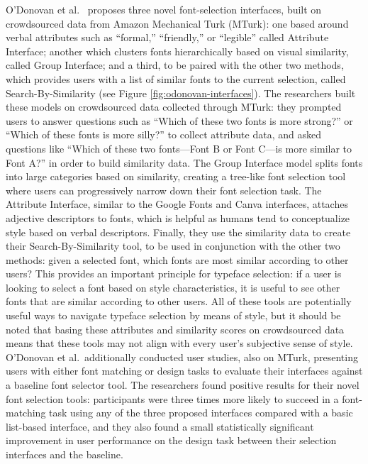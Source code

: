O'Donovan et al.\ \cite{odonovan2014} proposes three novel font-selection interfaces, built on crowdsourced data from Amazon Mechanical Turk (MTurk): one based around verbal attributes such as ``formal,'' ``friendly,'' or ``legible'' called Attribute Interface; another which clusters fonts hierarchically based on visual similarity, called Group Interface; and a third, to be paired with the other two methods, which provides users with a list of similar fonts to the current selection, called Search-By-Similarity (see Figure \ref{fig:odonovan-interfaces}). The researchers built these models on crowdsourced data collected through MTurk: they prompted users to answer questions such as ``Which of these two fonts is more strong?'' or ``Which of these fonts is more silly?'' to collect attribute data, and asked questions like ``Which of these two fonts—Font B or Font C—is more similar to Font A?'' in order to build similarity data. The Group Interface model splits fonts into large categories based on similarity, creating a tree-like font selection tool where users can progressively narrow down their font selection task. The Attribute Interface, similar to the Google Fonts and Canva interfaces, attaches adjective descriptors to fonts, which is helpful as humans tend to conceptualize style based on verbal descriptors. Finally, they use the similarity data to create their Search-By-Similarity tool, to be used in conjunction with the other two methods: given a selected font, which fonts are most similar according to other users? This provides an important principle for typeface selection: if a user is looking to select a font based on style characteristics, it is useful to see other fonts that are similar according to other users. All of these tools are potentially useful ways to navigate typeface selection by means of style, but it should be noted that basing these attributes and similarity scores on crowdsourced data means that these tools may not align with every user's subjective sense of style. O'Donovan et al.\ additionally conducted user studies, also on MTurk, presenting users with either font matching or design tasks to evaluate their interfaces against a baseline font selector tool. The researchers found positive results for their novel font selection tools: participants were three times more likely to succeed in a font-matching task using any of the three proposed interfaces compared with a basic list-based interface, and they also found a small statistically significant improvement in user performance on the design task between their selection interfaces and the baseline.

